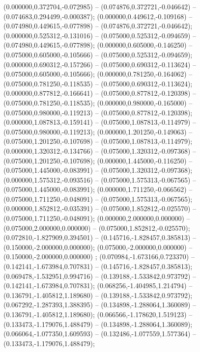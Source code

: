  (0.000000,0.372704,-0.072985) -- (0.074876,0.372721,-0.046642) -- (0.074683,0.294499,-0.000387);
 (0.000000,0.449612,-0.109168) -- (0.074980,0.449615,-0.077898) -- (0.074876,0.372721,-0.046642);
 (0.000000,0.525312,-0.131016) -- (0.075000,0.525312,-0.094659) -- (0.074980,0.449615,-0.077898);
 (0.000000,0.605000,-0.146250) -- (0.075000,0.605000,-0.105666) -- (0.075000,0.525312,-0.094659);
 (0.000000,0.690312,-0.157266) -- (0.075000,0.690312,-0.113624) -- (0.075000,0.605000,-0.105666);
 (0.000000,0.781250,-0.164062) -- (0.075000,0.781250,-0.118535) -- (0.075000,0.690312,-0.113624);
 (0.000000,0.877812,-0.166641) -- (0.075000,0.877812,-0.120398) -- (0.075000,0.781250,-0.118535);
 (0.000000,0.980000,-0.165000) -- (0.075000,0.980000,-0.119213) -- (0.075000,0.877812,-0.120398);
 (0.000000,1.087813,-0.159141) -- (0.075000,1.087813,-0.114979) -- (0.075000,0.980000,-0.119213);
 (0.000000,1.201250,-0.149063) -- (0.075000,1.201250,-0.107698) -- (0.075000,1.087813,-0.114979);
 (0.000000,1.320312,-0.134766) -- (0.075000,1.320312,-0.097368) -- (0.075000,1.201250,-0.107698);
 (0.000000,1.445000,-0.116250) -- (0.075000,1.445000,-0.083991) -- (0.075000,1.320312,-0.097368);
 (0.000000,1.575312,-0.093516) -- (0.075000,1.575313,-0.067565) -- (0.075000,1.445000,-0.083991);
 (0.000000,1.711250,-0.066562) -- (0.075000,1.711250,-0.048091) -- (0.075000,1.575313,-0.067565);
 (0.000000,1.852812,-0.035391) -- (0.075000,1.852812,-0.025570) -- (0.075000,1.711250,-0.048091);
 (0.000000,2.000000,0.000000) -- (0.075000,2.000000,0.000000) -- (0.075000,1.852812,-0.025570);
 (0.072810,-1.827909,0.394501) -- (0.145716,-1.828457,0.385813) -- (0.150000,-2.000000,0.000000);
 (0.075000,-2.000000,0.000000) -- (0.150000,-2.000000,0.000000) ;
 (0.070984,-1.673166,0.723370) -- (0.142141,-1.673984,0.707831) -- (0.145716,-1.828457,0.385813);
 (0.069478,-1.532951,0.994716) -- (0.139188,-1.533842,0.973792) -- (0.142141,-1.673984,0.707831);
 (0.068256,-1.404985,1.214794) -- (0.136791,-1.405812,1.189680) -- (0.139188,-1.533842,0.973792);
 (0.067292,-1.287393,1.388395) -- (0.134898,-1.288064,1.360089) -- (0.136791,-1.405812,1.189680);
 (0.066566,-1.178620,1.519123) -- (0.133473,-1.179076,1.488479) -- (0.134898,-1.288064,1.360089);
 (0.066064,-1.077350,1.609593) -- (0.132486,-1.077559,1.577364) -- (0.133473,-1.179076,1.488479);
